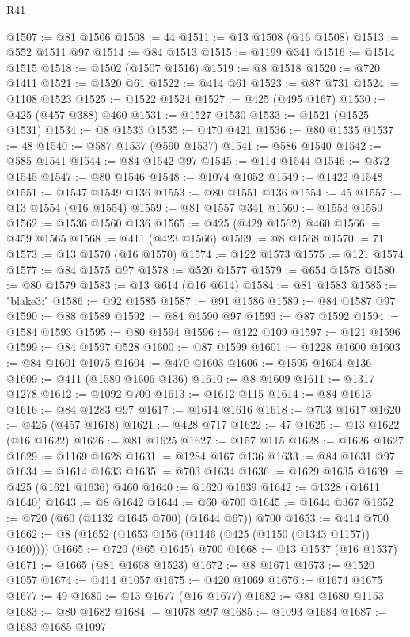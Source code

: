 \begin{lexlean}{R41}
\begin{coremodule}
@1507 := @81 @1506
@1508 := 44
@1511 := @13 @1508 (@16 @1508)
@1513 := @552 @1511 @97
@1514 := @84 @1513
@1515 := @1199 @341
@1516 := @1514 @1515
@1518 := @1502 (@1507 @1516)
@1519 := @8 @1518
@1520 := @720 @1411
@1521 := @1520 @61
@1522 := @414 @61
@1523 := @87 @731
@1524 := @1108 @1523
@1525 := @1522 @1524
@1527 := @425 (@495 @167)
@1530 := @425 (@457 @388) @460
@1531 := @1527 @1530
@1533 := @1521 (@1525 @1531)
@1534 := @8 @1533
@1535 := @470 @421
@1536 := @80 @1535
@1537 := 48
@1540 := @587 @1537 (@590 @1537)
@1541 := @586 @1540
@1542 := @585 @1541
@1544 := @84 @1542 @97
@1545 := @114 @1544
@1546 := @372 @1545
@1547 := @80 @1546
@1548 := @1074 @1052
@1549 := @1422 @1548
@1551 := @1547 @1549 @136
@1553 := @80 @1551 @136
@1554 := 45
@1557 := @13 @1554 (@16 @1554)
@1559 := @81 @1557 @341
@1560 := @1553 @1559
@1562 := @1536 @1560 @136
@1565 := @425 (@429 @1562) @460
@1566 := @459 @1565
@1568 := @411 (@423 @1566)
@1569 := @8 @1568
@1570 := 71
@1573 := @13 @1570 (@16 @1570)
@1574 := @122 @1573
@1575 := @121 @1574
@1577 := @84 @1575 @97
@1578 := @520 @1577
@1579 := @654 @1578
@1580 := @80 @1579
@1583 := @13 @614 (@16 @614)
@1584 := @81 @1583
@1585 := "blake3:"
@1586 := @92 @1585
@1587 := @91 @1586
@1589 := @84 @1587 @97
@1590 := @88 @1589
@1592 := @84 @1590 @97
@1593 := @87 @1592
@1594 := @1584 @1593
@1595 := @80 @1594
@1596 := @122 @109
@1597 := @121 @1596
@1599 := @84 @1597 @528
@1600 := @87 @1599
@1601 := @1228 @1600
@1603 := @84 @1601 @1075
@1604 := @470 @1603
@1606 := @1595 @1604 @136
@1609 := @411 (@1580 @1606 @136)
@1610 := @8 @1609
@1611 := @1317 @1278
@1612 := @1092 @700
@1613 := @1612 @115
@1614 := @84 @1613
@1616 := @84 @1283 @97
@1617 := @1614 @1616
@1618 := @703 @1617
@1620 := @425 (@457 @1618)
@1621 := @428 @717
@1622 := 47
@1625 := @13 @1622 (@16 @1622)
@1626 := @81 @1625
@1627 := @157 @115
@1628 := @1626 @1627
@1629 := @1169 @1628
@1631 := @1284 @167 @136
@1633 := @84 @1631 @97
@1634 := @1614 @1633
@1635 := @703 @1634
@1636 := @1629 @1635
@1639 := @425 (@1621 @1636) @460
@1640 := @1620 @1639
@1642 := @1328 (@1611 @1640)
@1643 := @8 @1642
@1644 := @60 @700
@1645 := @1644 @367
@1652 := @720 (@60 (@1132 @1645 @700) (@1644 @67)) @700
@1653 := @414 @700
@1662 := @8 (@1652 (@1653 @156 (@1146 (@425 (@1150 (@1343 @1157)) @460))))
@1665 := @720 (@65 @1645) @700
@1668 := @13 @1537 (@16 @1537)
@1671 := @1665 (@81 @1668 @1523)
@1672 := @8 @1671
@1673 := @1520 @1057
@1674 := @414 @1057
@1675 := @420 @1069
@1676 := @1674 @1675
@1677 := 49
@1680 := @13 @1677 (@16 @1677)
@1682 := @81 @1680 @1153
@1683 := @80 @1682
@1684 := @1078 @97
@1685 := @1093 @1684
@1687 := @1683 @1685 @1097

\end{coremodule}
\end{lexlean}
